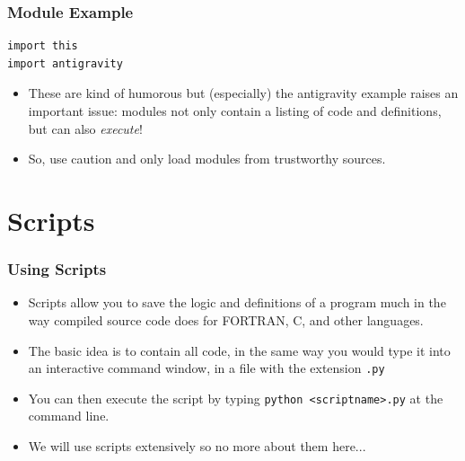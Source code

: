 \documentclass{beamer}
\begin{document}
\begin{frame}[fragile]
\frametitle{Module Example}

\begin{lstlisting}
import this
import antigravity
\end{lstlisting}
\pause
\begin{itemize}

\item These are kind of humorous but (especially) the antigravity example raises an important issue: modules not only contain a listing of code and definitions, but can also \emph{execute}!

\item So, use caution and only load modules from trustworthy sources.
\end{itemize}

\end{frame}

\section[]{Scripts}
\begin{frame}[fragile]
\frametitle{Using Scripts}
\begin{itemize}
\item Scripts allow you to save the logic and definitions of a program much in the
 way compiled source code does for FORTRAN, C, and other languages.
\item The basic idea is to contain all code, in the same way you would type it into an interactive 
command window, in a file with the extension \texttt{.py}
\item You can then execute the script by typing \newline{} \texttt{python <scriptname>.py} \newline{}at the command line.
\pause
\item We will use scripts extensively so no more about them here...
\end{itemize}
\end{frame}
\end{document}
